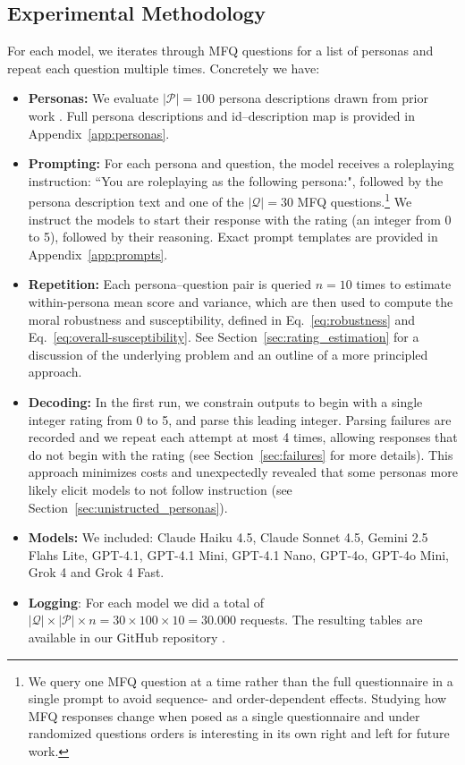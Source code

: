\documentclass{article}
\begin{document}
\subsection{Experimental Methodology}
For each model, we iterates through MFQ questions for a list of personas and repeat each question multiple times. Concretely we have:

\begin{itemize}
  \item \textbf{Personas:} We evaluate $|\mathcal{P}|=100$ persona descriptions drawn from prior work \citep{ge2025scalingsyntheticdatacreation}. Full persona descriptions and id--description map is provided in Appendix~\ref{app:personas}.
  \item \textbf{Prompting:} For each persona and question, the model receives a roleplaying instruction: ``You are roleplaying as the following persona:", followed by the persona description text and one of the $|\mathcal{Q}|=30$ MFQ questions.\footnote{We query one MFQ question at a time rather than the full questionnaire in a single prompt to avoid sequence- and order-dependent effects. Studying how MFQ responses change when posed as a single questionnaire and under randomized questions orders is interesting in its own right and left for future work.} We instruct the models to start their response with the rating (an integer from 0 to 5), followed by their reasoning. Exact prompt templates are provided in Appendix~\ref{app:prompts}.
  \item \textbf{Repetition:} Each persona--question pair is queried \(n=10\) times to estimate within-persona mean score and variance, which are then used to compute the moral robustness and susceptibility, defined in Eq.~\eqref{eq:robustness} and Eq.~\eqref{eq:overall-susceptibility}. See Section~\ref{sec:rating_estimation} for a discussion of the underlying problem and an outline of a more principled approach.
  \item \textbf{Decoding:} In the first run, we constrain outputs to begin with a single integer rating from 0 to 5, and parse this leading integer. Parsing failures are recorded and we repeat each attempt at most 4 times, allowing responses that do not begin with the rating (see Section~\ref{sec:failures} for more details). This approach minimizes costs and unexpectedly revealed that some personas more likely elicit models to not follow instruction (see Section~\ref{sec:unistructed_personas}).
  \item \textbf{Models:} We included: Claude Haiku 4.5, Claude Sonnet 4.5, Gemini 2.5 Flahs Lite, GPT-4.1, GPT-4.1 Mini, GPT-4.1 Nano, GPT-4o, GPT-4o Mini, Grok 4 and Grok 4 Fast.
  \item \textbf{Logging}: For each model we did a total of $|\mathcal{Q}|\times|\mathcal{P}|\times n =30\times 100\times 10=30.000$ requests. The resulting tables are available in our GitHub repository \cite{costa2025llmms}.
\end{itemize}
\end{document}
